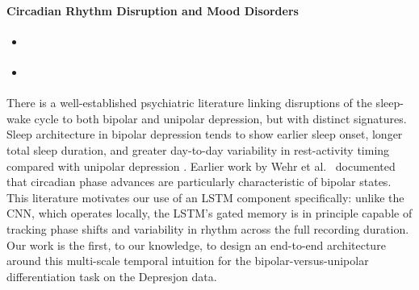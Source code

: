 \paragraph{Circadian Rhythm Disruption and Mood Disorders}
\begin{itemize}
    \item \cite{boudebesse2014sleep}
    \item \cite{wehr1987sleep}
\end{itemize}
There is a well-established psychiatric literature linking disruptions of the sleep-wake cycle to both bipolar and unipolar depression, but with distinct signatures. Sleep architecture in bipolar depression tends to show earlier sleep onset, longer total sleep duration, and greater day-to-day variability in rest-activity timing compared with unipolar depression \cite{boudebesse2014sleep}. Earlier work by Wehr et al.\ \cite{wehr1987sleep} documented that circadian phase advances are particularly characteristic of bipolar states. This literature motivates our use of an LSTM component specifically: unlike the CNN, which operates locally, the LSTM's gated memory is in principle capable of tracking phase shifts and variability in rhythm across the full recording duration. Our work is the first, to our knowledge, to design an end-to-end architecture around this multi-scale temporal intuition for the bipolar-versus-unipolar differentiation task on the Depresjon data.
